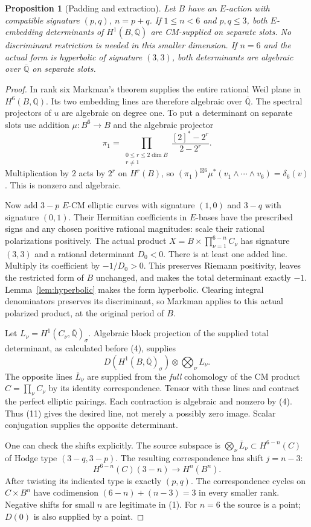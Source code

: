 \documentclass[11pt]{article}
\newcommand{\Q}{\mathbb Q}
\newcommand{\kk}{{\overline{\mathbb Q}}}
\newtheorem{proposition}[theorem]{Proposition}
\theoremstyle{remark}
\begin{document}
\begin{proposition}[Padding and extraction]\label{prop:padding}
Let $B$ have an $E$-action with compatible signature $(p,q)$,
$n=p+q$. If $1\leq n<6$ and $p,q\leq3$, both $E$-embedding
determinants of $H^1(B,\kk)$ are CM-supplied on separate slots.
No discriminant restriction is needed in this smaller dimension.
If $n=6$ and the actual form is hyperbolic of signature $(3,3)$,
both determinants are algebraic over $\kk$ on separate slots.
\end{proposition}
\begin{proof}
In rank six Markman's theorem supplies the entire rational Weil plane
in $H^6(B,\Q)$. Its two embedding lines are therefore algebraic
over $\kk$. The spectral projectors of $u$ are algebraic on degree one.
To put a determinant on separate slots use addition
$\mu:B^6\to B$ and the algebraic projector
\[
 \pi_1=\prod_{\substack{0\leq r\leq2\dim B\\r\ne1}}
                \frac{[2]^*-2^r}{2-2^r}.
 \tag{10}\label{eq:projector}
\]
Multiplication by $2$ acts by $2^r$ on $H^r(B)$, so
$(\pi_1)^{\boxtimes6}\mu^*(v_1\wedge\cdots\wedge v_6)=\delta_6(v)$.
This is nonzero and algebraic.

Now add $3-p$ $E$-CM elliptic curves with signature $(1,0)$ and
$3-q$ with signature $(0,1)$. Their Hermitian coefficients in
$E$-bases have the prescribed signs and any chosen positive rational
magnitudes: scale their rational polarizations positively.
The actual product $X=B\times\prod_{\nu=1}^{6-n}C_\nu$ has
signature $(3,3)$ and a rational determinant $D_0<0$.
There is at least one added line. Multiply its coefficient by
$-1/D_0>0$. This preserves Riemann positivity, leaves the restricted
form of $B$ unchanged, and makes the total determinant exactly $-1$.
Lemma~\ref{lem:hyperbolic} makes the form hyperbolic. Clearing integral
denominators preserves its discriminant, so Markman applies to this
actual polarized product, at the original period of $B$.

Let $L_\nu=H^1(C_\nu,\kk)_\sigma$. Algebraic block projection of
the supplied total determinant, as calculated before (4), supplies
\[
 D(H^1(B,\kk)_\sigma)\otimes\bigotimes_\nu L_\nu.
 \tag{11}\label{eq:padded-det}
\]
The opposite lines $\bar L_\nu$ are supplied from the \emph{full}
cohomology of the CM product $C=\prod_\nu C_\nu$ by its identity
correspondence. Tensor with these lines and contract the perfect
elliptic pairings. Each contraction is algebraic and nonzero by (4).
Thus (11) gives the desired line, not merely a possibly zero image.
Scalar conjugation supplies the opposite determinant.

One can check the shifts explicitly. The source subspace is
$\bigotimes_\nu\bar L_\nu\subset H^{6-n}(C)$ of Hodge type
$(3-q,3-p)$. The resulting correspondence has shift $j=n-3$:
\[
 H^{6-n}(C)(3-n)\longrightarrow H^n(B^n).
 \tag{12}\label{eq:padding-shift}
\]
After twisting its indicated type is exactly $(p,q)$.
The correspondence cycles on $C\times B^n$ have codimension
$(6-n)+(n-3)=3$ in every smaller rank.
Negative shifts for small $n$ are legitimate in (1).
For $n=6$ the source is a point; $D(0)$ is also supplied by a point.
\end{proof}
\end{document}
